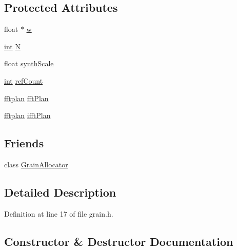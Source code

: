 \subsection*{Protected Attributes}
\begin{DoxyCompactItemize}
\item 
float $\ast$ \hyperlink{class__sbsms___1_1grain_ae4951d89820eaed1fde21b9fbd8e7b4d}{w}
\item 
\hyperlink{xmltok_8h_a5a0d4a5641ce434f1d23533f2b2e6653}{int} \hyperlink{class__sbsms___1_1grain_a007c0c0c9a0eed728ae3fb4aa379b145}{N}
\item 
float \hyperlink{class__sbsms___1_1grain_af52d60aff66b343ce32de1884d43c8b8}{synth\+Scale}
\item 
\hyperlink{xmltok_8h_a5a0d4a5641ce434f1d23533f2b2e6653}{int} \hyperlink{class__sbsms___1_1grain_ad2509f613840dc95c162c28c3fc9b204}{ref\+Count}
\item 
\hyperlink{namespace__sbsms___a7f1d3311b2efc8799b5c4bf22942e197}{fftplan} \hyperlink{class__sbsms___1_1grain_ae6d6c60eaef37e3383f623aa075e02d0}{fft\+Plan}
\item 
\hyperlink{namespace__sbsms___a7f1d3311b2efc8799b5c4bf22942e197}{fftplan} \hyperlink{class__sbsms___1_1grain_a13f6cf54f6fb64484142871ebf0e5d30}{ifft\+Plan}
\end{DoxyCompactItemize}
\subsection*{Friends}
\begin{DoxyCompactItemize}
\item 
class \hyperlink{class__sbsms___1_1grain_aaf3d063b7647463780a74162bd5154d4}{Grain\+Allocator}
\end{DoxyCompactItemize}


\subsection{Detailed Description}


Definition at line 17 of file grain.\+h.



\subsection{Constructor \& Destructor Documentation}
